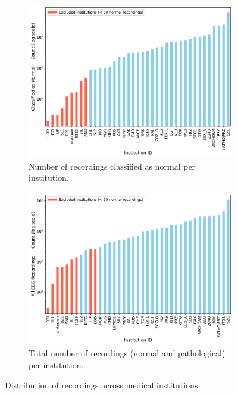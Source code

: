 \documentclass{bachelor2025eng}
\begin{document}
        \begin{figure}[htbp]
          \centering
          \begin{subfigure}[t]{0.48\textwidth}
            \centering
            \includegraphics[width=\textwidth]{results/ELM19_excluded_institutions_normal_recordings.png}
            \caption{Number of recordings classified as normal per institution.}
            \label{fig:normal_hist_excluded}
          \end{subfigure}
          \hfill
          \begin{subfigure}[t]{0.48\textwidth}
            \centering
            \includegraphics[width=\textwidth]{results/ELM19_excluded_institutions_all_recordings.png}
            \caption{Total number of recordings (normal and pathological) per institution.}
            \label{fig:total_hist_excluded}
          \end{subfigure}
          \caption{Distribution of recordings across medical institutions.}
          \label{fig:institution_histograms}
        \end{figure}
\end{document}
